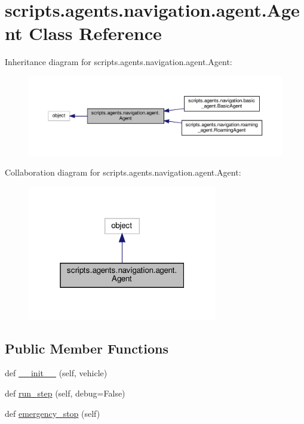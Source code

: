 \hypertarget{classscripts_1_1agents_1_1navigation_1_1agent_1_1Agent}{}\section{scripts.\+agents.\+navigation.\+agent.\+Agent Class Reference}
\label{classscripts_1_1agents_1_1navigation_1_1agent_1_1Agent}


Inheritance diagram for scripts.\+agents.\+navigation.\+agent.\+Agent\+:
\nopagebreak
\begin{figure}[H]
\begin{center}
\leavevmode
\includegraphics[width=350pt]{d5/d7e/classscripts_1_1agents_1_1navigation_1_1agent_1_1Agent__inherit__graph}
\end{center}
\end{figure}


Collaboration diagram for scripts.\+agents.\+navigation.\+agent.\+Agent\+:
\nopagebreak
\begin{figure}[H]
\begin{center}
\leavevmode
\includegraphics[width=235pt]{de/d72/classscripts_1_1agents_1_1navigation_1_1agent_1_1Agent__coll__graph}
\end{center}
\end{figure}
\subsection*{Public Member Functions}
\begin{DoxyCompactItemize}
\item 
def \hyperlink{classscripts_1_1agents_1_1navigation_1_1agent_1_1Agent_a0e2995e9cfb9a78b724338a26f565c13}{\+\_\+\+\_\+init\+\_\+\+\_\+} (self, vehicle)
\item 
def \hyperlink{classscripts_1_1agents_1_1navigation_1_1agent_1_1Agent_a0271d9ffb0c84bae593bce700a9cf5bc}{run\+\_\+step} (self, debug=False)
\item 
def \hyperlink{classscripts_1_1agents_1_1navigation_1_1agent_1_1Agent_a6c3c4d0e421923e9c4f1bbd478c1f9ea}{emergency\+\_\+stop} (self)
\end{DoxyCompactItemize}


